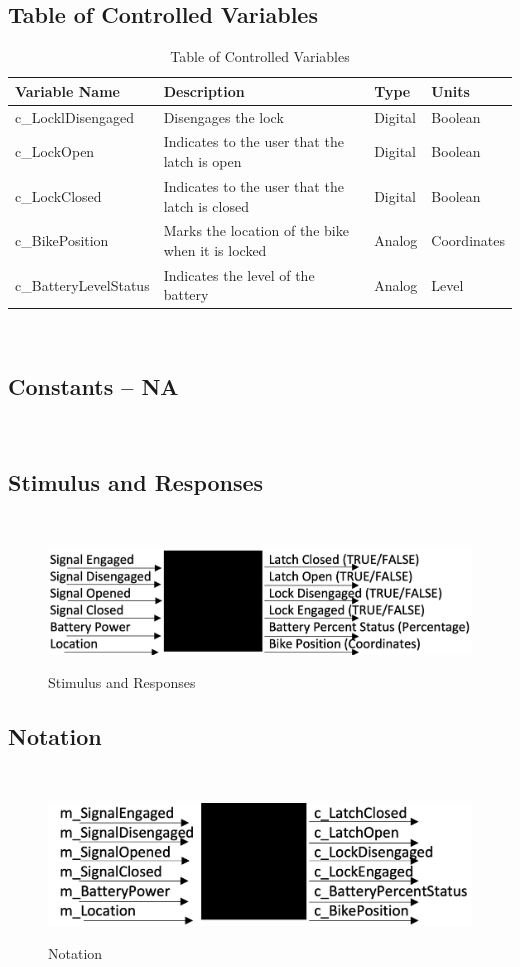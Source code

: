 \documentclass[12pt]{article}
\begin{document}
\subsection{Table of Controlled Variables}
\newpage
\begin{table}
\caption{Table of Controlled Variables} \label{Table of Controlled Variables}
\begin{tabular}{| p{} | p{} | p{} | p{} |}
 \hline
 Variable Name & Description & Type & Units \\ 
  \hline
 c\_LocklDisengaged & Disengages the lock & Digital & Boolean \\ 
  \hline
 c\_LockOpen & Indicates to the user that the latch is open & Digital & Boolean \\ 
  \hline
 c\_LockClosed& Indicates to the user that the latch is closed & Digital & Boolean \\ 
  \hline
 c\_BikePosition & Marks the location of the bike when it is locked & Analog & Coordinates \\ 
  \hline
 c\_BatteryLevelStatus & Indicates the level of the battery & Analog & Level \\ 
 \hline
\end{tabular}
\end{table}

~\newline
\subsection{Constants -- NA}
~\newline
\subsection{Stimulus and Responses}
~\newline
\begin{figure}[h!]
 \begin{center}
 {
 \includegraphics[width=0.6\linewidth]{./StimulusandResponses.jpeg}
 }
 \caption{\label{Stimulus and Responses} Stimulus and Responses}
 \end{center}
 \end{figure}
\subsection{Notation}
~\newline
\begin{figure}[h!]
 \begin{center}
 {
 \includegraphics[width=0.6\linewidth]{./Notation.jpeg}
 }
 \caption{\label{Notation} Notation}
 \end{center}
 \end{figure}
~\newpage
\end{document}
